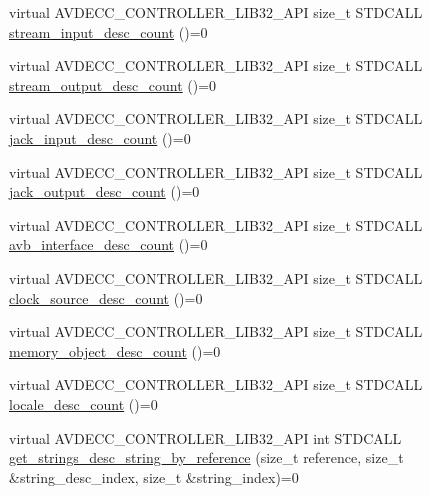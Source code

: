 \begin{DoxyCompactItemize}
\item 
virtual A\+V\+D\+E\+C\+C\+\_\+\+C\+O\+N\+T\+R\+O\+L\+L\+E\+R\+\_\+\+L\+I\+B32\+\_\+\+A\+PI size\+\_\+t S\+T\+D\+C\+A\+LL \hyperlink{classavdecc__lib_1_1configuration__descriptor_ab7ef88f0a1d5d8c27f0c4c6687f6a98e}{stream\+\_\+input\+\_\+desc\+\_\+count} ()=0
\item 
virtual A\+V\+D\+E\+C\+C\+\_\+\+C\+O\+N\+T\+R\+O\+L\+L\+E\+R\+\_\+\+L\+I\+B32\+\_\+\+A\+PI size\+\_\+t S\+T\+D\+C\+A\+LL \hyperlink{classavdecc__lib_1_1configuration__descriptor_a9ebee6c612e3cfec50f5168790bd265c}{stream\+\_\+output\+\_\+desc\+\_\+count} ()=0
\item 
virtual A\+V\+D\+E\+C\+C\+\_\+\+C\+O\+N\+T\+R\+O\+L\+L\+E\+R\+\_\+\+L\+I\+B32\+\_\+\+A\+PI size\+\_\+t S\+T\+D\+C\+A\+LL \hyperlink{classavdecc__lib_1_1configuration__descriptor_a35f643c39d514fca78d2536149b664a9}{jack\+\_\+input\+\_\+desc\+\_\+count} ()=0
\item 
virtual A\+V\+D\+E\+C\+C\+\_\+\+C\+O\+N\+T\+R\+O\+L\+L\+E\+R\+\_\+\+L\+I\+B32\+\_\+\+A\+PI size\+\_\+t S\+T\+D\+C\+A\+LL \hyperlink{classavdecc__lib_1_1configuration__descriptor_aaf9f94d8037864a664f7d3e267df6dd7}{jack\+\_\+output\+\_\+desc\+\_\+count} ()=0
\item 
virtual A\+V\+D\+E\+C\+C\+\_\+\+C\+O\+N\+T\+R\+O\+L\+L\+E\+R\+\_\+\+L\+I\+B32\+\_\+\+A\+PI size\+\_\+t S\+T\+D\+C\+A\+LL \hyperlink{classavdecc__lib_1_1configuration__descriptor_aadd99a4b7397158e900eca5791b773bf}{avb\+\_\+interface\+\_\+desc\+\_\+count} ()=0
\item 
virtual A\+V\+D\+E\+C\+C\+\_\+\+C\+O\+N\+T\+R\+O\+L\+L\+E\+R\+\_\+\+L\+I\+B32\+\_\+\+A\+PI size\+\_\+t S\+T\+D\+C\+A\+LL \hyperlink{classavdecc__lib_1_1configuration__descriptor_a705df684f456b2c082d52c563125e853}{clock\+\_\+source\+\_\+desc\+\_\+count} ()=0
\item 
virtual A\+V\+D\+E\+C\+C\+\_\+\+C\+O\+N\+T\+R\+O\+L\+L\+E\+R\+\_\+\+L\+I\+B32\+\_\+\+A\+PI size\+\_\+t S\+T\+D\+C\+A\+LL \hyperlink{classavdecc__lib_1_1configuration__descriptor_a4fcdc5299d3ef799c90daf54040ead95}{memory\+\_\+object\+\_\+desc\+\_\+count} ()=0
\item 
virtual A\+V\+D\+E\+C\+C\+\_\+\+C\+O\+N\+T\+R\+O\+L\+L\+E\+R\+\_\+\+L\+I\+B32\+\_\+\+A\+PI size\+\_\+t S\+T\+D\+C\+A\+LL \hyperlink{classavdecc__lib_1_1configuration__descriptor_ab677ec4987bcd55bfcfa0e524b6f78f6}{locale\+\_\+desc\+\_\+count} ()=0
\item 
virtual A\+V\+D\+E\+C\+C\+\_\+\+C\+O\+N\+T\+R\+O\+L\+L\+E\+R\+\_\+\+L\+I\+B32\+\_\+\+A\+PI int S\+T\+D\+C\+A\+LL \hyperlink{classavdecc__lib_1_1configuration__descriptor_a3f384e636a80f7a66b477b1d7963b347}{get\+\_\+strings\+\_\+desc\+\_\+string\+\_\+by\+\_\+reference} (size\+\_\+t reference, size\+\_\+t \&string\+\_\+desc\+\_\+index, size\+\_\+t \&string\+\_\+index)=0

\end{DoxyCompactItemize}
